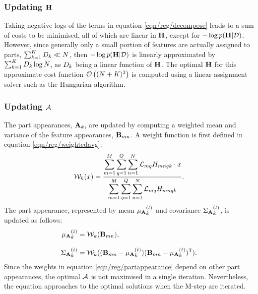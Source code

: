 \subsubsection{Updating $\mathbf{H}$}
Taking negative logs of the terms in equation \ref{eqn/reg/decompose} leads to a sum of costs to be minimised, all of which are linear in $\mathbf{H}$, except for $-\log p(\mathbf{H}|\mathcal{D})$. 
However, since generally only a small portion of features are actually assigned to parts, \ie $\sum_{k=1}^{K}{D}_k \ll N$, then $-\log p(\mathbf{H}|\mathcal{D})$ is linearly approximated by $\sum_{k=1}^{K}{D}_k\log N$,  as ${D}_k$ being a linear function of $\mathbf{H}$. The optimal $\mathbf{H}$ for this approximate cost function $\mathcal{O}\left((N + K)^3\right)$ is computed using a linear assignment solver such as the Hungarian algorithm.  

\subsubsection{Updating $\mathcal{A}$}
The part appearances, $\mathbf{A}_k$, are updated by computing a weighted mean and variance of the feature appearances, $\mathbf{B}_{mn}$. A weight function is first defined in equation \ref{eqn/reg/weightedavg}:
\begin{equation}
	\mathcal{W}_k(x) = \frac{\displaystyle\sum_{m=1}^M \displaystyle\sum_{q = 1}^{Q} \displaystyle\sum_{n=1}^{N}\mathcal{L}_{mq}{H}_{mnqk} \cdot x}{\displaystyle\sum_{m=1}^M \displaystyle\sum_{q = 1}^{Q} \displaystyle\sum_{n=1}^{N}\mathcal{L}_{mq}{H}_{mnqk}}.
	\label{eqn/reg/weightedavg} 
\end{equation}
The part appearance, represented by mean ${\mu_{\mathbf{A}}}_{k}^{(t)}$ and covariance ${\Sigma_{\mathbf{A}}}_{k}^{(t)}$, is updated as follows:  
\begin{equation}
	\begin{aligned}
		{\mu_{\mathbf{A}}}_{k}^{(t)} & = \mathcal{W}_k(\mathbf{B}_{mn}), \\[3mm]  
		{\Sigma_{\mathbf{A}}}_{k}^{(t)} & = \mathcal{W}_k((\mathbf{B}_{mn} - {\mu_{\mathbf{A}}}_{k}^{(t)})(\mathbf{B}_{mn} - {\mu_{\mathbf{A}}}_{k}^{(t)})^{\textsf{T}}).
	\end{aligned}
	\label{eqn/reg/partappearance}
\end{equation}
Since the weights in equation \ref{eqn/reg/partappearance} depend on other part appearances, the optimal $\mathcal{A}$ is not maximised in a single iteration. Nevertheless, the equation approaches to the optimal solutions when the M-step are iterated. 

